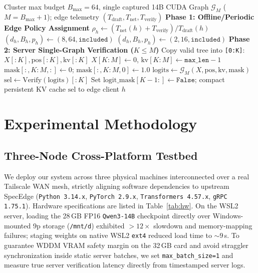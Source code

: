 \documentclass[10pt,conference]{IEEEtran}
\begin{document}
\begin{algorithm}[t]
\caption{Heterogeneity-Aware Edge Policy \& Variable-Budget Zero-Padding Verification}
\label{alg:varbudget}
\begin{algorithmic}[1]
\REQUIRE Cluster max budget $B_{\max}{=}64$, single captured 14B CUDA Graph $\mathcal{G}_M$ ($M{=}B_{\max}{+}1$); edge telemetry $(T_{\mathrm{draft}}, T_{\mathrm{net}}, T_{\mathrm{verify}})$
\STATE \textbf{Phase 1: Offline/Periodic Edge Policy Assignment}
  \STATE $\rho_h \leftarrow (T_{\mathrm{net}}(h) + T_{\mathrm{verify}}) / T_{\mathrm{draft}}(h)$
    \STATE $(d_h, B_h, p_h) \leftarrow (8, 64, \texttt{included})$ 
  \ELSE
    \STATE $(d_h, B_h, p_h) \leftarrow (2, 16, \texttt{included})$ 
  \ENDIF
\ENDFOR
\STATE \textbf{Phase 2: Server Single-Graph Verification ($K \le M$)}
\STATE Copy valid tree into \texttt{[0:K]}: $X[:K], \text{pos}[:K], \text{kv}[:K]$
  \STATE $X[K:M] \leftarrow 0$, $\text{kv}[K:M] \leftarrow \texttt{max\_len} - 1$ 
  \STATE $\text{mask}[:, K:M, :] \leftarrow 0$; $\text{mask}[:, K:M, 0] \leftarrow 1.0$ 
\ENDIF
\STATE $\text{logits} \leftarrow \mathcal{G}_M(X, \text{pos}, \text{kv}, \text{mask})$ 
\STATE $\text{sel} \leftarrow \mathrm{Verify}(\text{logits})[:K]$ 
\STATE Set $\text{logit\_mask}[K{-}1:] \leftarrow \texttt{False}$; compact persistent KV cache
\RETURN $\text{sel}$ to edge client $h$
\end{algorithmic}
\end{algorithm}

\section{Experimental Methodology}

\subsection{Three-Node Cross-Platform Testbed}

We deploy our system across three physical machines interconnected over a real Tailscale WAN mesh, strictly aligning software dependencies to upstream SpecEdge (\texttt{Python 3.14.x}, \texttt{PyTorch 2.9.x}, \texttt{Transformers 4.57.x}, \texttt{gRPC 1.75.1}). Hardware specifications are listed in Table~\ref{tab:hw}. On the WSL2 server, loading the 28\,GB FP16 \texttt{Qwen3-14B} checkpoint directly over Windows-mounted 9p storage (\texttt{/mnt/d}) exhibited $>12\times$ slowdown and memory-mapping failures; staging weights on native WSL2 \texttt{ext4} reduced load time to $\sim 9$\,s. To guarantee WDDM VRAM safety margin on the 32\,GB card and avoid straggler synchronization inside static server batches, we set \texttt{max\_batch\_size=1} and measure true server verification latency directly from timestamped server logs.
\end{document}
